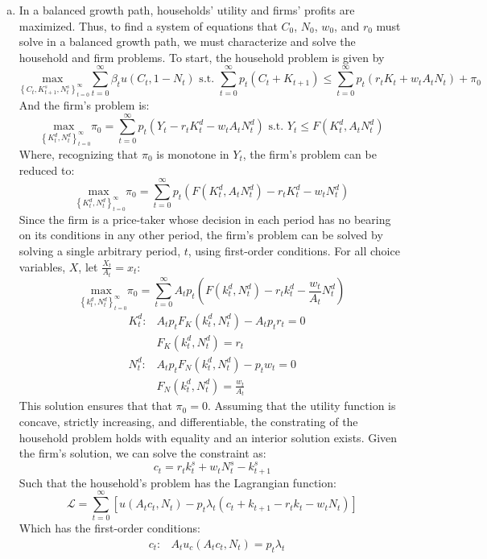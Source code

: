 \documentclass{article}
\newcommand{\usmax}[1]{\underset{#1}{\text{max }}}
\renewcommand{\L}{\mathcal{L}}
\newcommand{\zinf}{_{t=0}^\infty}
\begin{document}
\begin{enumerate}[(a)]
	\item In a balanced growth path, households' utility and firms' profits are maximized. Thus, to find a system of equations that $C_0$, $N_0$, $w_0$, and $r_0$ must solve in a balanced growth path, we must characterize and solve the household and firm problems. To start, the household problem is given by 
		\[
			\usmax{\left\{C_t,K^s_{t+1},N^s_t\right\}_{t=0}^\infty}\sum_{t=0}^\infty \beta_t u(C_t,1-N_t)\text{ s.t. }
				\sum_{t=0}^\infty p_t\left(C_t + K_{t+1}\right) \leq \sum_{t=0}^\infty p_t\left(r_tK_t + w_tA_tN_t\right) + \pi_0
		\]
		And the firm's problem is:
		\[
			\usmax{\left\{K_t^d,N_t^d\right\}_{t=0}^\infty}\pi_0 = \sum\zinf p_t\left(Y_t-r_tK_t^d - w_tA_tN_t^d\right)\text{ s.t. } Y_t\leq F(K_t^d,A_tN_t^d)
		\]
		Where, recognizing that $\pi_0$ is monotone in $Y_t$, the firm's problem can be reduced to:
		\[
			\usmax{\left\{K_t^d,N_t^d\right\}_{t=0}^\infty}\pi_0 = \sum\zinf p_t\left(F(K_t^d,A_tN_t^d)-r_tK_t^d - w_tN_t^d\right)
		\]
		Since the firm is a price-taker whose decision in each period has no bearing on its conditions in any other period, the firm's problem can be solved by solving a single arbitrary period, $t$, using first-order conditions. For all choice variables, $X$, let ${\frac{X_t}{A_t} = x_t}$:
		\[
			\usmax{\left\{k_t^d,N_t^d\right\}_{t=0}^\infty}\pi_0 = \sum\zinf A_tp_t\left(F(k_t^d,N_t^d)-r_tk_t^d - \frac{w_t}{A_t}N_t^d\right)
		\]
		\begin{align*}
			&K_t^d: & A_tp_tF_K(k_t^d,N_t^d) -A_tp_tr_t = 0	\\
			&		& F_K(k_t^d,N_t^d) = r_t				\\
			&N_t^d:	& A_tp_tF_N(k_t^d,N_t^d) -p_tw_t = 0	\\
			&		& F_N(k_t^d,N_t^d) = \frac{w_t}{A_t}
		\end{align*}
		This solution ensures that that $\pi_0=0$. Assuming that the utility function is concave, strictly increasing, and differentiable, the constrating of the household problem holds with equality and an interior solution exists. Given the firm's solution, we can solve the constraint as:
		\[
				c_t = r_tk^s_t + w_tN^s_t - k^s_{t+1}
		\]
		Such that the household's problem has the Lagrangian function:
		\[
			\L = \sum\zinf\left[u(A_tc_t,N_t) - p_t\lambda_t\left(c_t + k_{t+1} - r_tk_t - w_tN_t\right)\right]
		\]
		Which has the first-order conditions:
		\begin{align*}
			&c_t: 			& A_tu_c(A_tc_t,N_t) = 	p_t\lambda_t 							\\

\end{align*}
\end{enumerate}
\end{document}
